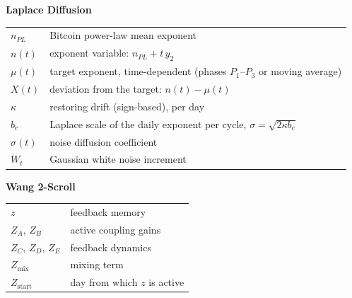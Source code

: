 \documentclass[11pt,a4paper]{article}
\begin{document}
\medskip

\noindent\textbf{\color{cdiff}Laplace Diffusion}

\smallskip\noindent
\begin{tabular}{@{}ll@{}}
  $n_{PL}$  & Bitcoin power-law mean exponent \\[2pt]
  $n(t)$   & exponent variable: $n_{PL} + t\,y_2$ \\[2pt]
  $\mu(t)$ & target exponent, time-dependent (phases $P_1$--$P_3$ or moving average) \\[2pt]
  $X(t)$   & deviation from the target: $n(t) - \mu(t)$ \\[2pt]
  $\kappa$ & restoring drift (sign-based), per day \\[2pt]
  $b_c$    & Laplace scale of the daily exponent per cycle, $\sigma = \sqrt{2\kappa b_c}$ \\[2pt]
  $\sigma(t)$ & noise diffusion coefficient \\[2pt]
  $\dot{W}_t$ & Gaussian white noise increment\\
\end{tabular}

\medskip

\noindent\textbf{\color{cwang}Wang 2-Scroll}

\smallskip\noindent
\begin{tabular}{@{}ll@{}}
  $z$                  & feedback memory \\[2pt]
  $Z_A,\,Z_B$          & active coupling gains \\[2pt]
  $Z_C,\,Z_D,\,Z_E$    & feedback dynamics \\[2pt]
  $Z_{\mathrm{mix}}$   & mixing term \\[2pt]
  $Z_{\mathrm{start}}$ & day from which $z$ is active \\
\end{tabular}

\medskip

\noindent{\color{muted}\rule{\linewidth}{0.4pt}}
\end{document}
